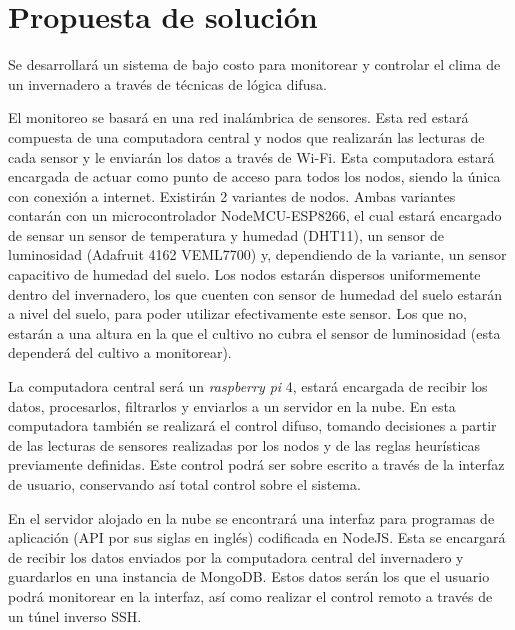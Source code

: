\section{Propuesta de solución}

Se desarrollará un sistema de bajo costo para monitorear y controlar el clima de un invernadero a través de técnicas de lógica difusa.

El monitoreo se basará en una red inalámbrica de sensores. Esta red estará compuesta de una computadora central y nodos que realizarán las lecturas de cada sensor y le enviarán los datos a través de Wi-Fi. Esta computadora estará encargada de actuar como punto de acceso para todos los nodos, siendo la única con conexión a internet. Existirán 2 variantes de nodos. Ambas variantes contarán con un microcontrolador NodeMCU-ESP8266, el cual estará encargado de sensar un sensor de temperatura y humedad (DHT11), un sensor de luminosidad (Adafruit 4162 VEML7700) y, dependiendo de la variante, un sensor capacitivo de humedad del suelo. Los nodos estarán dispersos uniformemente dentro del invernadero, los que cuenten con sensor de humedad del suelo estarán a nivel del suelo, para poder utilizar efectivamente este sensor. Los que no, estarán a una altura en la que el cultivo no cubra el sensor de luminosidad (esta dependerá del cultivo a monitorear). 

La computadora central será un \textit{raspberry pi} 4, estará encargada de recibir los datos, procesarlos, filtrarlos y enviarlos a un servidor en la nube. En esta computadora también se realizará el control difuso, tomando decisiones a partir de las lecturas de sensores realizadas por los nodos y de las reglas heurísticas previamente definidas. Este control podrá ser sobre escrito a través de la interfaz de usuario, conservando así total control sobre el sistema.

En el servidor alojado en la nube se encontrará una interfaz para programas de aplicación (API por sus siglas en inglés) codificada en NodeJS. Esta se encargará de recibir los datos enviados por la computadora central del invernadero y guardarlos en una instancia de MongoDB. Estos datos serán los que el usuario podrá monitorear en la interfaz, así como realizar el control remoto a través de un túnel inverso SSH.
